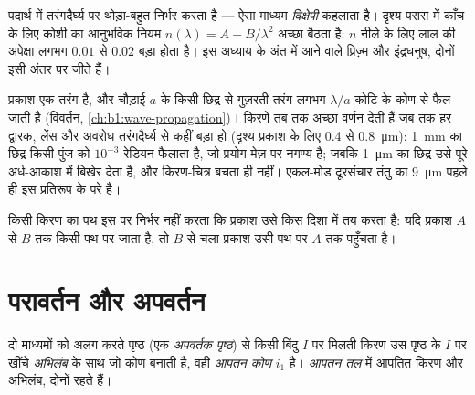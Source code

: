\begin{remark}[वर्ण-विक्षेपण]\label{rem:b1:rays-reflection-refraction:dispersion}
पदार्थ में  तरंगदैर्घ्य पर थोड़ा-बहुत निर्भर करता है --- ऐसा माध्यम
\emph{विक्षेपी} कहलाता है। दृश्य परास में काँच के लिए कोशी का आनुभविक नियम
$n(\lambda) = A + B/\lambda^2$ अच्छा बैठता है: $n$ नीले के लिए लाल की अपेक्षा
लगभग $0.01$ से $0.02$ बड़ा होता है। इस अध्याय के अंत में आने वाले प्रिज़्म और
इंद्रधनुष, दोनों इसी अंतर पर जीते हैं।
\end{remark}

\begin{remark}[प्रतिरूप की सीमाएँ]\label{rem:b1:rays-reflection-refraction:limits}
प्रकाश एक तरंग है, और चौड़ाई $a$ के किसी छिद्र से गुज़रती तरंग लगभग
$\lambda/a$ कोटि के कोण से फैल जाती है (विवर्तन,
\cref{ch:b1:wave-propagation})। किरणें तब तक अच्छा वर्णन देती हैं जब तक हर
द्वारक, लेंस और अवरोध तरंगदैर्घ्य से कहीं बड़ा हो (दृश्य प्रकाश के लिए
\qty{0.4}{} से \qty{0.8}{\micro m}): \qty{1}{mm} का छिद्र किसी पुंज को
$10^{-3}$ रेडियन फैलाता है, जो प्रयोग-मेज़ पर नगण्य है; जबकि
\qty{1}{\micro m} का छिद्र उसे पूरे अर्ध-आकाश में बिखेर देता है, और किरण-चित्र
बचता ही नहीं। एकल-मोड दूरसंचार तंतु का \qty{9}{\micro m}  पहले ही इस
प्रतिरूप के परे है।
\end{remark}

\begin{proposition}[प्रकाश की वापसी]\label{prop:b1:rays-reflection-refraction:reversibility}
किसी किरण का पथ इस पर निर्भर नहीं करता कि प्रकाश उसे किस दिशा में तय करता है:
यदि प्रकाश $A$ से $B$ तक किसी पथ पर जाता है, तो $B$ से चला प्रकाश उसी पथ पर
$A$ तक पहुँचता है।
\end{proposition}
\admitted

\section{परावर्तन और अपवर्तन}

\begin{definition}[आपतन]\label{def:b1:rays-reflection-refraction:incidence}
दो माध्यमों को अलग करते पृष्ठ (एक \emph{अपवर्तक पृष्ठ}) से किसी बिंदु $I$ पर
मिलती किरण उस पृष्ठ के $I$ पर खींचे \emph{अभिलंब} के साथ जो कोण बनाती है, वही
\emph{आपतन कोण} $i_1$ है। \emph{आपतन तल} में आपतित किरण और अभिलंब, दोनों
रहते हैं।
\end{definition}

